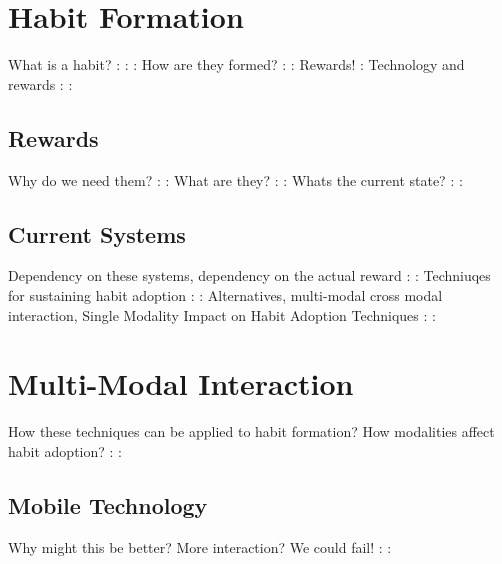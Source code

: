 \newpage
\section{Habit Formation}
What is a habit?
:\newline
:\newline
:\newline
How are they formed?
:\newline
:\newline
Rewards!
:\newline
Technology and rewards
:\newline
:\newline


\subsection{Rewards}
Why do we need them?
:\newline
:\newline
What are they?
:\newline
:\newline
Whats the current state?
:\newline
:\newline

\subsection{Current Systems}
Dependency on these systems, dependency on the actual reward
:\newline
:\newline
Techniuqes for sustaining habit adoption
:\newline
:\newline
Alternatives, multi-modal cross modal interaction, Single Modality Impact on Habit Adoption Techniques
:\newline
:\newline

\newpage
\section{Multi-Modal Interaction}
How these techniques can be applied to habit formation? How modalities affect habit adoption?
:\newline
:\newline
\subsection{Mobile Technology}
Why might this be better? More interaction? We could fail!
:\newline
:\newline
